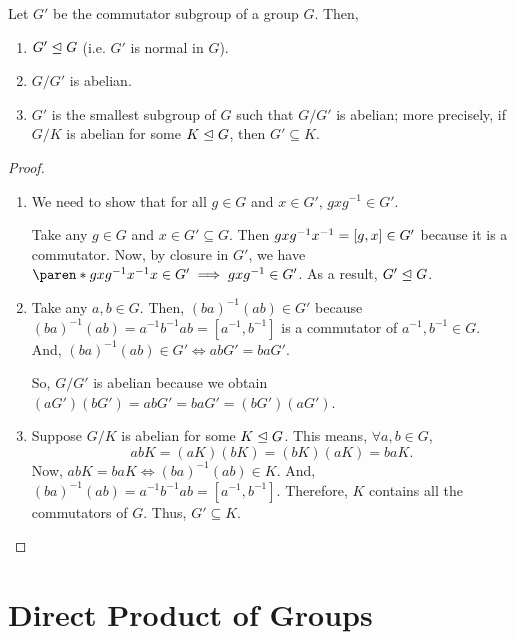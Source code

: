 \documentclass[11pt]{penrose}
\begin{document}
\begin{nthm}
    Let $G'$ be the commutator subgroup of a group $G$. Then,
    \begin{enumerate}
        \item $G' \mathrel{\trianglelefteq} G$ (i.e. $G'$ is normal in $G$).
        \item $G / G'$ is abelian.
        \item $G'$ is the smallest subgroup of $G$ such that $G/G'$ is abelian; more precisely, if $G / K$ is abelian for some $K \mathrel{\trianglelefteq} G$, then $G' \subseteq K$.
    \end{enumerate}
\end{nthm}
\begin{proof}
    \phantom{}
    \begin{enumerate}
        \item We need to show that for all $g \in G$ and $x \in G'$, $g x g^{-1} \in G'$.

        Take any $g \in G$ and $x \in G' \subseteq G$. Then $g x g^{-1} x^{-1} = \lbrack g, x\rbrack \in G'$ because it is a commutator. Now, by closure in $G'$, we have
        $\paren*{ g x g^{-1} x^{-1} } x \in G' \implies g x g^{-1} \in G'$. As a result, $G' \mathrel{\trianglelefteq} G$.

        \item Take any $a, b \in G$. Then, $(ba)^{-1} (ab) \in G'$ because $(ba)^{-1} (ab) = a^{-1} b^{-1} a b = [a^{-1}, b^{-1}]$ is a commutator of $a^{-1}, b^{-1} \in G$. And, $(ba)^{-1} (ab) \in G' \iff ab G' = ba G'$.

        So, $G/G'$ is abelian because we obtain $(aG')(bG') = ab G' = ba G' = (bG')(aG')$.

        \item Suppose $G/K$ is abelian for some $K \mathrel{\trianglelefteq} G$. This means, $\forall a,b \in G$,
        \begin{equation*}
            abK = (aK)(bK) = (bK)(aK) = baK.
        \end{equation*}
        Now, $abK = baK \iff (ba)^{-1}(ab) \in K$. And, $(ba)^{-1} (ab) = a^{-1} b^{-1} a b = [a^{-1}, b^{-1}]$. Therefore, $K$ contains all the commutators of $G$. Thus, $G' \subseteq K$.
        \qedhere
    \end{enumerate}
\end{proof}

\section{Direct Product of Groups}
\end{document}
